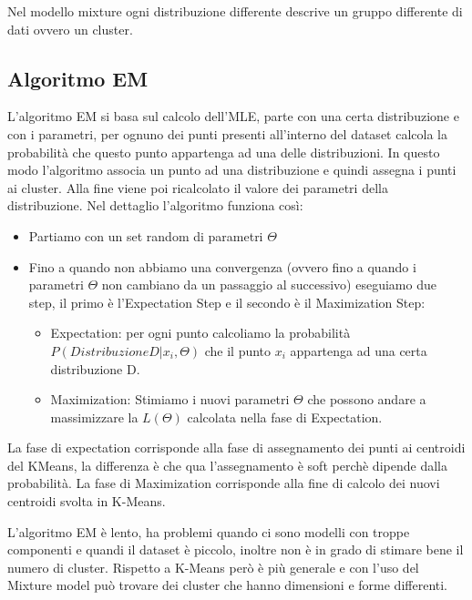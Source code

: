 \documentclass[14pt]{extreport}
\begin{document}
Nel modello mixture ogni distribuzione differente descrive un gruppo differente di dati ovvero un cluster.

\subsection{Algoritmo EM}

L'algoritmo EM si basa sul calcolo dell'MLE, parte con una certa distribuzione e con i parametri, per ognuno dei punti presenti all'interno del dataset calcola la probabilità che questo punto appartenga ad una delle distribuzioni. In questo modo l'algoritmo associa un punto ad una distribuzione e quindi assegna i punti ai cluster.
Alla fine viene poi ricalcolato il valore dei parametri della distribuzione.
Nel dettaglio l'algoritmo funziona così:

\begin{itemize}
    \item Partiamo con un set random di parametri $\Theta$
    \item Fino a quando non abbiamo una convergenza (ovvero fino a quando i parametri $\Theta$ non cambiano da un passaggio al successivo) eseguiamo due step, il primo è l'Expectation Step e il secondo è il Maximization Step:
        \begin{itemize}
            \item Expectation: per ogni punto calcoliamo la probabilità \newline $P(Distribuzione D|x_i,\Theta)$ che il punto $x_i$ appartenga ad una certa distribuzione D. 
            \item Maximization: Stimiamo i nuovi parametri $\Theta$ che possono andare a massimizzare la $L(\Theta)$ calcolata nella fase di Expectation.
        \end{itemize}
\end{itemize}

La fase di expectation corrisponde alla fase di assegnamento dei punti ai centroidi del KMeans, la differenza è che qua l'assegnamento è soft perchè dipende dalla probabilità.
La fase di Maximization corrisponde alla fine di calcolo dei nuovi centroidi svolta in K-Means.

L'algoritmo EM è lento, ha problemi quando ci sono modelli con troppe componenti e quandi il dataset è piccolo, inoltre non è in grado di stimare bene il numero di cluster.
Rispetto a K-Means però è più generale e con l'uso del Mixture model può trovare dei cluster che hanno dimensioni e forme differenti.
\end{document}
